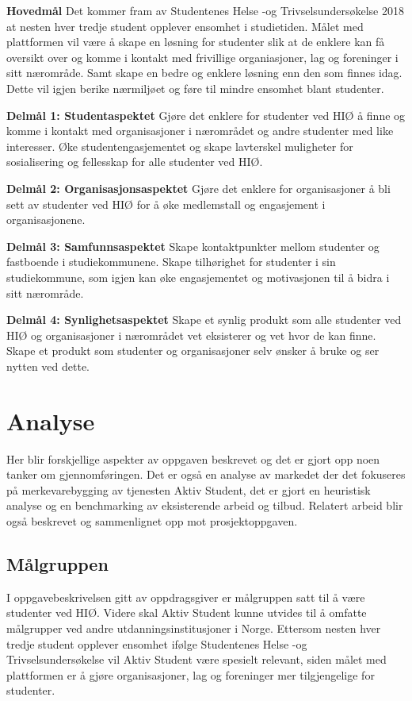 \begin{compactitem}
\item [{\bf Hovedmål}] Det kommer fram av Studentenes Helse -og Trivselsundersøkelse 2018 at nesten hver tredje student opplever ensomhet i studietiden. \cite{SHOT:2} Målet med plattformen vil være å skape en løsning for studenter slik at de enklere kan få oversikt over og komme i kontakt med frivillige organiasjoner, lag og foreninger i sitt nærområde. Samt skape en bedre og enklere løsning enn den som finnes idag. Dette vil igjen berike nærmiljøet og føre til mindre ensomhet blant studenter.
\begin{compactitem}
\item [{\bf  Delmål 1: Studentaspektet} ] Gjøre det enklere for studenter ved HIØ å finne og komme i kontakt med organisasjoner i nærområdet og andre studenter med like interesser. Øke studentengasjementet og skape lavterskel muligheter for sosialisering og fellesskap for alle studenter ved HIØ.
\item [{\bf  Delmål 2: Organisasjonsaspektet} ] Gjøre det enklere for organisasjoner å bli sett av studenter ved HIØ for å øke medlemstall og engasjement i organisasjonene.
\item [{\bf  Delmål 3: Samfunnsaspektet} ] Skape kontaktpunkter mellom studenter og fastboende i studiekommunene. Skape tilhørighet for studenter i sin studiekommune, som igjen kan øke engasjementet og motivasjonen til å bidra i sitt nærområde.
\item [{\bf  Delmål 4: Synlighetsaspektet} ] Skape et synlig produkt som alle studenter ved HIØ og organisasjoner i nærområdet vet eksisterer og vet hvor de kan finne. Skape et produkt som studenter og organisasjoner selv ønsker å bruke og ser nytten ved dette.
\end{compactitem} 
\end{compactitem}

\section{Analyse}
Her blir forskjellige aspekter av oppgaven beskrevet og det er gjort opp noen tanker om gjennomføringen. Det er også en analyse av markedet der det fokuseres på merkevarebygging av tjenesten Aktiv Student, det er gjort en heuristisk analyse og en benchmarking av eksisterende arbeid og tilbud. Relatert arbeid blir også beskrevet og sammenlignet opp mot prosjektoppgaven.

\subsection{Målgruppen}
I oppgavebeskrivelsen gitt av oppdragsgiver er målgruppen satt til å være studenter ved HIØ. Videre skal Aktiv Student kunne utvides til å omfatte målgrupper ved andre utdanningsinstitusjoner i Norge. 
Ettersom nesten hver tredje student opplever ensomhet ifølge Studentenes Helse -og Trivselsundersøkelse \cite{SHOT:2} vil Aktiv Student være spesielt relevant, siden målet med plattformen er å gjøre organisasjoner, lag og foreninger mer tilgjengelige for studenter.

